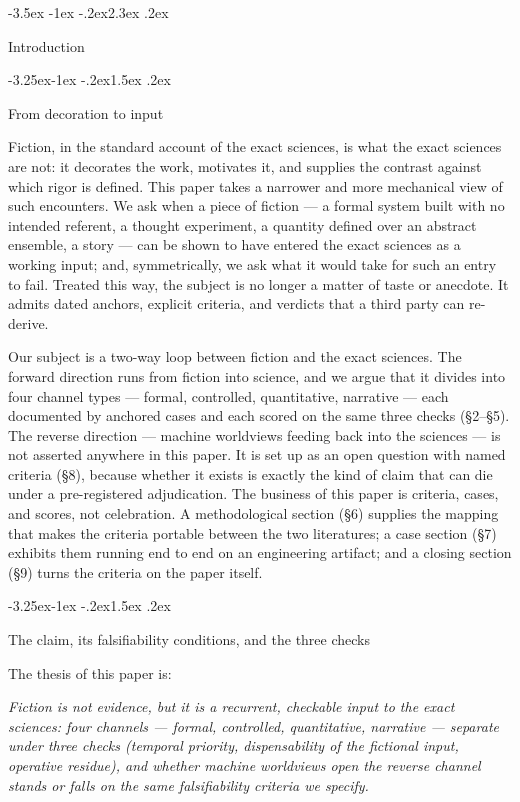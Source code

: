 \documentclass[11pt,a4paper]{article}
\makeatletter
\renewcommand\section{\@startsection{section}{1}{\z@}%
  {-3.5ex \@plus -1ex \@minus -.2ex}{2.3ex \@plus .2ex}%
  {\normalfont\Large\bfseries\raggedright}}
\renewcommand\subsection{\@startsection{subsection}{2}{\z@}%
  {-3.25ex\@plus -1ex \@minus -.2ex}{1.5ex \@plus .2ex}%
  {\normalfont\large\bfseries\raggedright}}
\makeatother
\begin{document}
\section{Introduction}

\subsection{From decoration to input}

Fiction, in the standard account of the exact sciences, is what the exact sciences are not: it decorates the work, motivates it, and supplies the contrast against which rigor is defined. This paper takes a narrower and more mechanical view of such encounters. We ask when a piece of fiction — a formal system built with no intended referent, a thought experiment, a quantity defined over an abstract ensemble, a story — can be shown to have entered the exact sciences as a working input; and, symmetrically, we ask what it would take for such an entry to fail. Treated this way, the subject is no longer a matter of taste or anecdote. It admits dated anchors, explicit criteria, and verdicts that a third party can re-derive.

Our subject is a two-way loop between fiction and the exact sciences. The forward direction runs from fiction into science, and we argue that it divides into four channel types — formal, controlled, quantitative, narrative — each documented by anchored cases and each scored on the same three checks (§2–§5). The reverse direction — machine worldviews feeding back into the sciences — is not asserted anywhere in this paper. It is set up as an open question with named criteria (§8), because whether it exists is exactly the kind of claim that can die under a pre-registered adjudication. The business of this paper is criteria, cases, and scores, not celebration. A methodological section (§6) supplies the mapping that makes the criteria portable between the two literatures; a case section (§7) exhibits them running end to end on an engineering artifact; and a closing section (§9) turns the criteria on the paper itself.

\subsection{The claim, its falsifiability conditions, and the three checks}

The thesis of this paper is:

\textit{Fiction is not evidence, but it is a recurrent, checkable input to the exact sciences: four channels — formal, controlled, quantitative, narrative — separate under three checks (temporal priority, dispensability of the fictional input, operative residue), and whether machine worldviews open the reverse channel stands or falls on the same falsifiability criteria we specify.}
\end{document}
